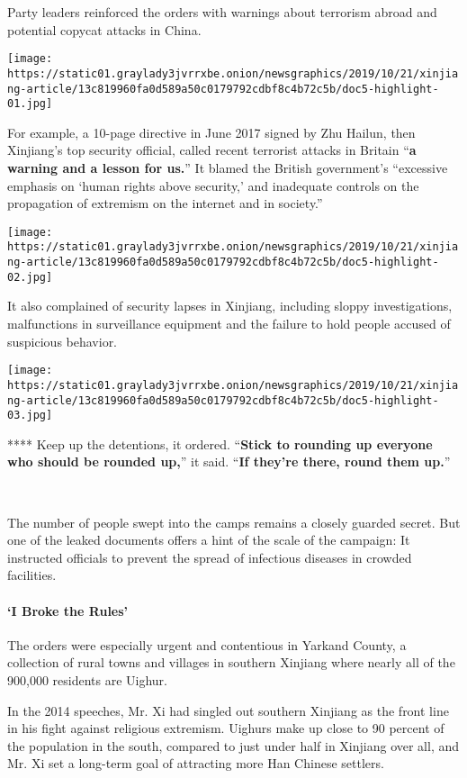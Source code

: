 Party leaders reinforced the orders with warnings about terrorism abroad
and potential copycat attacks in China.

\texttt{[image: https://static01.graylady3jvrrxbe.onion/newsgraphics/2019/10/21/xinjiang-article/13c819960fa0d589a50c0179792cdbf8c4b72c5b/doc5-highlight-01.jpg]}

For example, a 10-page directive in June 2017 signed by Zhu Hailun, then
Xinjiang's top security official, called recent terrorist attacks in
Britain ``\textbf{a warning and a lesson for us.}'' It blamed the
British government's ``excessive emphasis on `human rights above
security,' and inadequate controls on the propagation of extremism on
the internet and in society.''

\texttt{[image: https://static01.graylady3jvrrxbe.onion/newsgraphics/2019/10/21/xinjiang-article/13c819960fa0d589a50c0179792cdbf8c4b72c5b/doc5-highlight-02.jpg]}

It also complained of security lapses in Xinjiang, including sloppy
investigations, malfunctions in surveillance equipment and the failure
to hold people accused of suspicious behavior.

\texttt{[image: https://static01.graylady3jvrrxbe.onion/newsgraphics/2019/10/21/xinjiang-article/13c819960fa0d589a50c0179792cdbf8c4b72c5b/doc5-highlight-03.jpg]}

 **** Keep up the detentions, it ordered. ``\textbf{Stick to rounding up
everyone who should be rounded up,}'' it said. ``\textbf{If they're
there, round them up.}''

​

The number of people swept into the camps remains a closely guarded
secret. But one of the leaked documents offers a hint of the scale of
the campaign: It instructed officials to prevent the spread of
infectious diseases in crowded facilities.

\hypertarget{-i-broke-the-rules-}{%
\paragraph{ `I Broke the Rules' }\label{-i-broke-the-rules-}}

The orders were especially urgent and contentious in Yarkand County, a
collection of rural towns and villages in southern Xinjiang where nearly
all of the 900,000 residents are Uighur.

In the 2014 speeches, Mr. Xi had singled out southern Xinjiang as the
front line in his fight against religious extremism. Uighurs make up
close to 90 percent of the population in the south, compared to just
under half in Xinjiang over all, and Mr. Xi set a long-term goal of
attracting more Han Chinese settlers.

